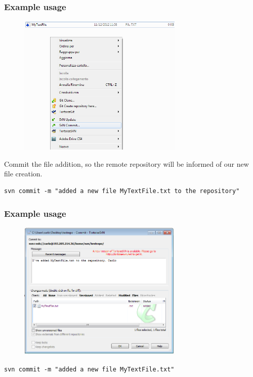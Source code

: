 \documentclass[10pt]{beamer}
\begin{document}
\begin{frame}[fragile]
\frametitle{Example usage}
\begin{figure}[h]
 \centering
 \includegraphics[width=0.7\textwidth]{images/image8.png}
\end{figure}
Commit the file addition, so the remote repository will be informed of our new file creation.
\begin{verbatim}
svn commit -m "added a new file MyTextFile.txt to the repository"
\end{verbatim}
\end{frame}

\begin{frame}[fragile]
\frametitle{Example usage}
\begin{figure}[h]
 \centering
 \includegraphics[width=0.7\textwidth]{images/image9.png}
\end{figure}
\begin{verbatim}
svn commit -m "added a new file MyTextFile.txt"
\end{verbatim}
\end{frame}
\end{document}
